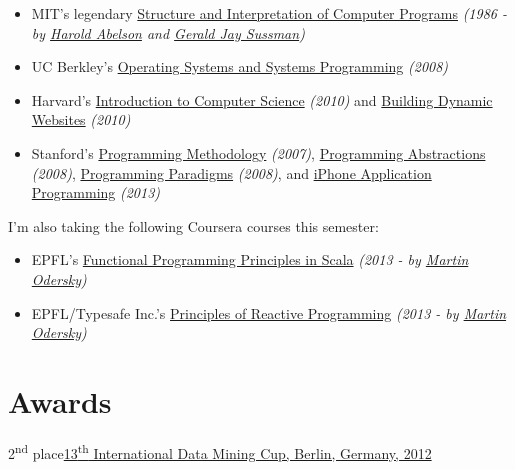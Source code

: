 \documentclass{tccv}
\begin{document}
\begin{itemize}

\item MIT's legendary \href{http://groups.csail.mit.edu/mac/classes/6.001/abelson-sussman-lectures/}{Structure and Interpretation of Computer Programs} {\it(1986 - by \href{https://en.wikipedia.org/wiki/Hal_Abelson}{Harold Abelson} and \href{https://en.wikipedia.org/wiki/Gerald_Jay_Sussman}{Gerald Jay Sussman})}

\item UC Berkley's \href{http://www.cs.berkeley.edu/~kubitron/courses/cs162-F08/}{Operating Systems and Systems Programming} {\it(2008)}

\item Harvard's \href{http://cs50.tv/2010/fall/}{Introduction to Computer Science} {\it(2010)} and \href{http://cs75.tv/2010/fall/}{Building Dynamic Websites} {\it(2010)}

\item Stanford's \href{http://see.stanford.edu/see/courseinfo.aspx?coll=824a47e1-135f-4508-a5aa-866adcae1111}{Programming Methodology} {\it(2007)}, \href{http://see.stanford.edu/see/courseinfo.aspx?coll=11f4f422-5670-4b4c-889c-008262e09e4e}{Programming Abstractions} {\it(2008)}, \href{http://see.stanford.edu/see/courseinfo.aspx?coll=2d712634-2bf1-4b55-9a3a-ca9d470755ee}{Programming Paradigms} {\it(2008)}, and \href{http://www.stanford.edu/class/cs193p}{iPhone Application Programming} {\it(2013)}
	
\end{itemize}

I'm also taking the following Coursera courses this semester: 

\begin{itemize}

\item EPFL's \href{https://www.coursera.org/course/progfun}{Functional Programming Principles in Scala} {\it(2013 - by \href{https://en.wikipedia.org/wiki/Martin_Odersky}{Martin Odersky})}

\item EPFL/Typesafe Inc.'s \href{https://www.coursera.org/course/reactive}{Principles of Reactive Programming} {\it(2013 - by \href{https://en.wikipedia.org/wiki/Martin_Odersky}{Martin Odersky})}

\end{itemize}






\section{Awards}

\begin{factlist}
\item{2\textsuperscript{nd} place}{\href{http://www.data-mining-cup.de/en/review/dmc-2012/}{13\textsuperscript{th} International Data Mining Cup, Berlin, Germany, 2012}}
\end{factlist}
\end{document}
